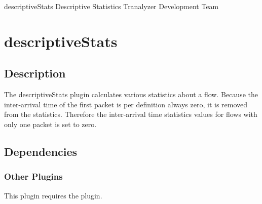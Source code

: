 \documentclass[documentation]{subfiles}
\begin{document}
\trantitle
    {descriptiveStats}
    {Descriptive Statistics}
    {Tranalyzer Development Team} %

\section{descriptiveStats}\label{s:descriptiveStats}

\subsection{Description}
The descriptiveStats plugin calculates various statistics about a flow.
Because the inter-arrival time of the first packet is per definition always zero, it is removed from the statistics.
Therefore the inter-arrival time statistics values for flows with only one packet is set to zero.

\subsection{Dependencies}




\subsubsection{Other Plugins}
This plugin requires the  plugin.

\end{document}
